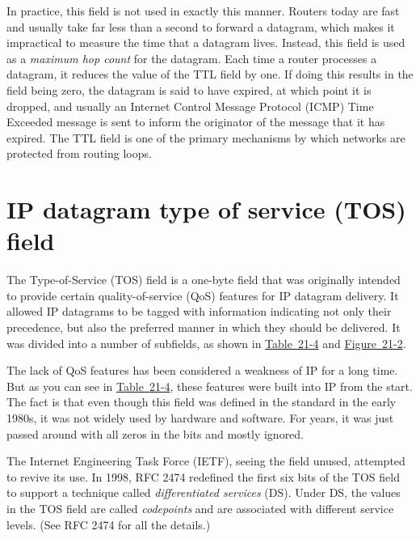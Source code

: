 In practice, this field is not used in exactly this manner.
Routers today are fast and usually take far less than a second to forward a datagram, which makes it impractical to measure the time that a datagram lives.
Instead, this field is used as a \emph{maximum hop count} for the datagram.
Each time a router processes a datagram, it reduces the value of the TTL field by one.
If doing this results in the field being zero, the datagram is said to have expired, at which point it is dropped,
and usually an Internet Control Message Protocol (ICMP) Time Exceeded message is sent to inform the originator of the message that it has expired.
The TTL field is one of the primary mechanisms by which networks are protected from routing loops.





\section{IP datagram type of service (TOS) field}
\label{sec:ip-datagram-tos}

The Type-of-Service (TOS) field is a one-byte field that was originally intended to provide certain quality-of-service (QoS) features for IP datagram delivery.
It allowed IP datagrams to be tagged with information indicating not only their precedence, but also the preferred manner in which they should be delivered.
It was divided into a number of subfields, as shown in
\protect\hyperlink{ch21s02.htmlux5cux23original_definition_of_ipv_type_of_servi}{Table~21-4}
and
\protect\hyperlink{ch21s02.htmlux5cux23ipv4_datagram_format_this_diagram_shows_}{Figure~21-2}.

The lack of QoS features has been considered a weakness of IP for a long
time. But as you can see in
\protect\hyperlink{ch21s02.htmlux5cux23original_definition_of_ipv_type_of_servi}{Table~21-4},
these features were built into IP from the start. The fact is that even
though this field was defined in the standard in the early 1980s, it was
not widely used by hardware and software. For years, it was just passed
around with all zeros in the bits and mostly ignored.

The Internet Engineering Task Force (IETF), seeing the field unused,
attempted to revive its use. In 1998, RFC 2474 redefined the first six
bits of the TOS field to support a technique called
\emph{differentiated services} (DS). Under DS, the values in the TOS field are called
\emph{codepoints} and are associated with different service levels.
(See RFC 2474 for all the details.)


